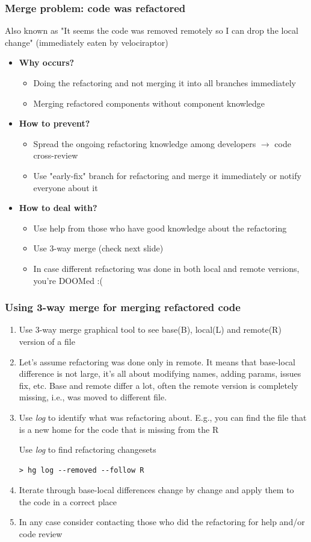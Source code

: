 \documentclass{beamer}
\begin{document}
\begin{frame}
\frametitle{Merge problem: code was refactored}
Also known as "It seems the code was removed remotely so I can drop the local change" (immediately eaten by velociraptor)


\begin{itemize}
\item \textbf{Why occurs?}
\begin{itemize}
\item Doing the refactoring and not merging it into all branches immediately
\item Merging refactored components without component knowledge
\end{itemize}
\item \textbf{How to prevent?}
\begin{itemize}
\item Spread the ongoing refactoring knowledge among developers $\to$ code cross-review
\item Use "early-fix" branch for refactoring and merge it immediately or notify everyone about it
\end{itemize}
\item \textbf{How to deal with?}
\begin{itemize}
\item Use help from those who have good knowledge about the refactoring
\item Use 3-way merge (check next slide)
\item In case different refactoring was done in both local and remote versions, you're DOOMed :(
\end{itemize}
\end{itemize}
\end{frame}

\begin{frame}[fragile]
\frametitle{Using 3-way merge for merging refactored code}
\begin{enumerate}
\item Use 3-way merge graphical tool to see base(B), local(L) and remote(R) version of a file
\item Let's assume refactoring was done only in remote. It means that base-local difference is not large, it's all about modifying names, adding params, issues fix, etc. Base and remote differ a lot, often the remote version is completely missing, i.e., was moved to different file.
\item Use \textit{log} to identify what was refactoring about. E.g., you can find the file that is a new home for the code that is missing from the R
\begin{exampleblock}{Use \textit{log} to find refactoring changesets}
\begin{verbatim}
> hg log --removed --follow R 
\end{verbatim}
\end{exampleblock}
\item Iterate through base-local differences change by change and apply them to the code in a correct place
\item In any case consider contacting those who did the refactoring for help and/or code review
\end{enumerate}
\end{frame}
\end{document}
